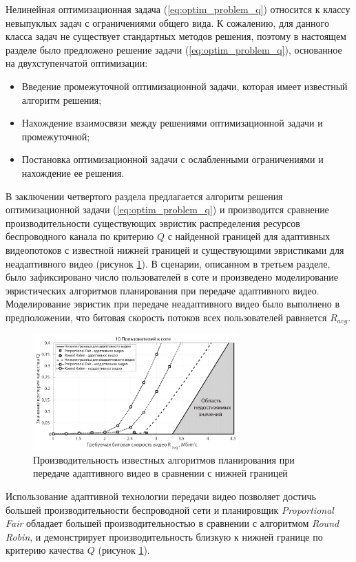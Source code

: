 Нелинейная оптимизационная задача (\ref{eq:optim_problem_q}) относится к классу невыпуклых задач с ограничениями общего вида. К сожалению, для данного класса задач не существует стандартных методов решения, поэтому в настоящем разделе было предложено решение задачи (\ref{eq:optim_problem_q}), основанное на двухступенчатой оптимизации:
\begin{itemize}
	\item Введение промежуточной оптимизационной задачи, которая имеет известный алгоритм решения;
	\item Нахождение взаимосвязи между решениями оптимизационной задачи и промежуточной;
	\item Постановка оптимизационной задачи с ослабленными ограничениями и нахождение ее решения.
\end{itemize}
В заключении четвертого раздела предлагается алгоритм решения оптимизационной задачи (\ref{eq:optim_problem_q}) и производится сравнение производительности существующих эвристик распределения ресурсов беспроводного канала по критерию $Q$ с найденной границей для адаптивных видеопотоков с известной нижней границей и существующими эвристиками для неадаптивного видео (рисунок \ref{fig:Q_PLOT}). В сценарии, описанном в третьем разделе, было зафиксировано число пользователей в соте и произведено моделирование эвристических алгоритмов планирования при передаче адаптивного видео. Моделирование эвристик при передаче неадаптивного видео было выполнено в предположении, что битовая скорость потоков всех пользователей равняется $R_{avg}$.

\begin{figure}[H]
\begin{center}
\includegraphics[width=0.7\textwidth]{../Dissertation/images/Chapter4/10_Users_v2.pdf}
\caption{Производительность известных алгоритмов планирования при передаче адаптивного видео в сравнении с нижней границей}
\label{fig:Q_PLOT}
\end{center}
\end{figure}
Использование адаптивной технологии передачи видео позволяет достичь большей производительности беспроводной сети и планировщик \textit{Proportional Fair} обладает большей производительностью в сравнении с алгоритмом \textit{Round Robin}, и демонстрирует производительность близкую к нижней границе по критерию качества $Q$ (рисунок \ref{fig:Q_PLOT}).

